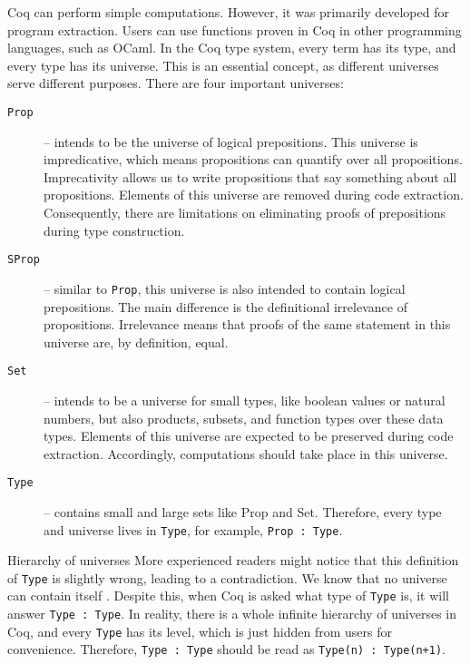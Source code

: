 Coq can perform simple computations. However, it was primarily developed for program extraction. Users can use functions proven in Coq in other programming languages, such as OCaml. In the Coq type system, every term has its type, and every type has its universe. This is an essential concept, as different universes serve different purposes. There are four important universes:

\begin{description}
\item[\texttt{Prop}] -- intends to be the universe of logical prepositions. This universe is impredicative, which means propositions can quantify over all propositions. Imprecativity allows us to write propositions that say something about all propositions. Elements of this universe are removed during code extraction. Consequently, there are limitations on eliminating proofs of prepositions during type construction.

\item[\texttt{SProp}] -- similar to \texttt{Prop}, this universe is also intended to contain logical prepositions. The main difference is the definitional irrelevance of propositions. Irrelevance means that proofs of the same statement in this universe are, by definition, equal.

\item[\texttt{Set}] -- intends to be a universe for small types, like boolean values or natural numbers, but also products, subsets, and function types over these data types. Elements of this universe are expected to be preserved during code extraction. Accordingly, computations should take place in this universe.

\item[\texttt{Type}] -- contains small and large sets like Prop and Set. Therefore, every type and universe lives in \texttt{Type}, for example, \texttt{Prop : Type}.
\end{description}

\begin{coq}{Hierarchy of universes}{}
 More experienced readers might notice that this definition of \texttt{Type} is slightly wrong, leading to a contradiction. We know that no universe can contain itself \cite{TypeNotInType}. Despite this, when Coq is asked what type of \texttt{Type} is, it will answer \texttt{Type : Type}. In reality, there is a whole infinite hierarchy of universes in Coq, and every \texttt{Type} has its level, which is just hidden from users for convenience. Therefore, \texttt{Type : Type} should be read as \texttt{Type(n) : Type(n+1)}.
\end{coq}

